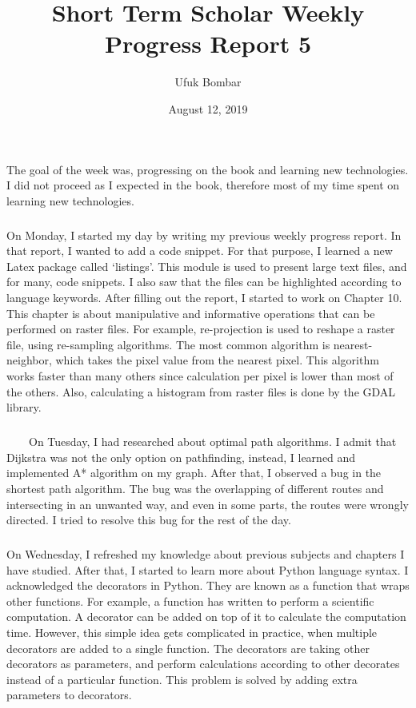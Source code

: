\documentclass[a4paper]{article}
\title{Short Term Scholar Weekly Progress Report 5}
\author{Ufuk Bombar}
\date{August 12, 2019}
\begin{document}
    \maketitle{}

    
    \subparagraph{}
    The goal of the week was, progressing on the book and learning new technologies. I did not proceed as I expected in the book, therefore most of my time spent on learning new technologies.

    \subparagraph{}
    On Monday, I started my day by writing my previous weekly progress report. In that report, I wanted to add a code snippet. For that purpose, I learned a new Latex package called ‘listings’. This module is used to present large text files, and for many, code snippets. I also saw that the files can be highlighted according to language keywords. After filling out the report, I started to work on Chapter 10. This chapter is about manipulative and informative operations that can be performed on raster files. For example, re-projection is used to reshape a raster file, using re-sampling algorithms. The most common algorithm is nearest-neighbor, which takes the pixel value from the nearest pixel. This algorithm works faster than many others since calculation per pixel is lower than most of the others. Also, calculating a histogram from raster files is done by the GDAL library.
    
    \subparagraph{}
        On Tuesday, I had researched about optimal path algorithms. I admit that Dijkstra was not the only option on pathfinding, instead, I learned and implemented A* algorithm on my graph. After that, I observed a bug in the shortest path algorithm. The bug was the overlapping of different routes and intersecting in an unwanted way, and even in some parts, the routes were wrongly directed. I tried to resolve this bug for the rest of the day.
    
    \subparagraph{}
    On Wednesday, I refreshed my knowledge about previous subjects and chapters I have studied. After that, I started to learn more about Python language syntax. I acknowledged the decorators in Python. They are known as a function that wraps other functions. For example, a function has written to perform a scientific computation. A decorator can be added on top of it to calculate the computation time. However, this simple idea gets complicated in practice, when multiple decorators are added to a single function. The decorators are taking other decorators as parameters, and perform calculations according to other decorates instead of a particular function. This problem is solved by adding extra parameters to decorators.
    
\end{document}
